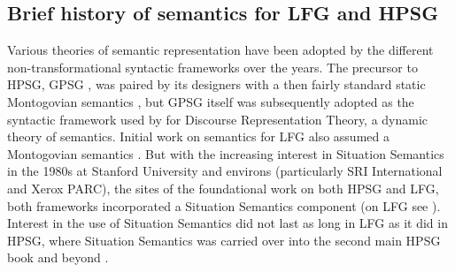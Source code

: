 \subsection{Brief history of semantics for LFG and HPSG}
\label{sec:background}

%
%
%

Various theories of semantic representation have been adopted by the different non-transformational syntactic frameworks over the years.  
The precursor to HPSG, GPSG \citep{GKPS85a}, was paired by its designers with a then fairly standard static Montogovian semantics \citep{Montague73a-u}, but GPSG itself was subsequently adopted as the syntactic framework used by \citet[9]{kamp;reyle93} for Discourse Representation Theory, a dynamic theory of semantics.  Initial work on semantics for LFG also assumed a Montogovian semantics \citep{halvorsen83,halvorsen;kaplan88}.  But with the increasing interest in Situation Semantics \citep{barwise;perry83} in the 1980s at Stanford University and environs (particularly SRI International and Xerox PARC), the sites of the foundational work on both HPSG and LFG, both frameworks 
incorporated a Situation Semantics component (on LFG see  \citealt{fenstad;ea87}).  
Interest in the use of Situation Semantics did not last as long in LFG as it did in HPSG, 
where Situation Semantics was
carried over into the second main HPSG book \citep{ps2} and beyond \citep{ginzburg;sag00}.

